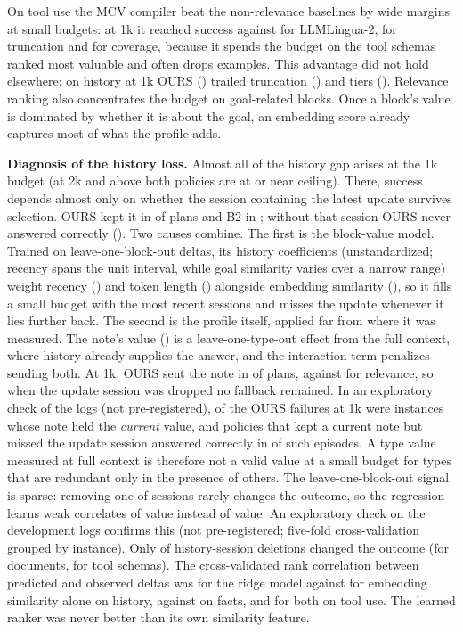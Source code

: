 On tool use the MCV compiler beat the non-relevance baselines by wide margins at small budgets: at 1k it reached
\RSucToolOursOne success against \RSucToolLinguaOne for LLMLingua-2, \RSucToolTruncOne for truncation and
\RSucToolCovOne for coverage, because it spends the budget on the tool schemas ranked most valuable and often drops
examples. This advantage did not hold elsewhere: on history at 1k OURS (\RSucHistoryOursOne) trailed truncation
(\RSucHistoryTruncOne) and tiers (\RSucHistoryTierOne). Relevance ranking also concentrates the budget on goal-related blocks. Once a block's value is dominated by
whether it is about the goal, an embedding score already captures most of what the profile adds.

\textbf{Diagnosis of the history loss.} Almost all of the history gap arises at the 1k budget (at 2k and above both policies
are at or near ceiling). There, success depends almost only on whether the session containing the latest update
survives selection. OURS kept it in \RRecallOurs of plans and B2 in \RRecallRel; without that session OURS never
answered correctly (\RSucGivenNoGoldOurs). Two causes combine. The first is the block-value model. Trained on
leave-one-block-out deltas, its history coefficients (unstandardized; recency spans the unit interval, while goal similarity varies over a narrow range) weight recency (\RCoefRecency) and token length
(\RCoefLen) alongside embedding similarity (\RCoefSim), so it fills a small budget with the most recent sessions and
misses the update whenever it lies further back. The second is the profile itself, applied far from where it was
measured. The note's value (\RMcvHistoryNote) is a leave-one-type-out effect from the full context, where history already
supplies the answer, and the interaction term penalizes sending both. At 1k, OURS sent the note in \RNoteInOursOne of
plans, against \RNoteInRelOne for relevance, so when the update session was dropped no fallback remained. In an
exploratory check of the logs (not pre-registered), \ROursFailCurrentNote of the \ROursFailHistOne OURS failures at 1k
were instances whose note held the \emph{current} value, and policies that kept a current note but missed the update
session answered correctly in \RNoteRescueRate of \RNoteRescueN such episodes. A type value measured at full context is
therefore not a valid value at a small budget for types that are redundant only in the presence of others. The
leave-one-block-out signal is sparse: removing one of \RNumSessions sessions rarely changes the outcome, so the
regression learns weak correlates of value instead of value. An exploratory check on the development logs confirms this (not
pre-registered; five-fold cross-validation grouped by instance). Only \RCvNonzeroHistory of history-session deletions
changed the outcome (\RCvNonzeroFacts for documents, \RCvNonzeroTool for tool schemas). The cross-validated rank
correlation between predicted and observed deltas was \RCvModelHistory for the ridge model against \RCvSimHistory for
embedding similarity alone on history, \RCvModelFacts against \RCvSimFacts on facts, and \RCvModelTool for both on
tool use. The learned ranker was never better than its own similarity feature.

